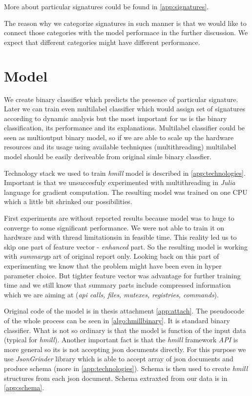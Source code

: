 More about particular signatures could be found in \ref{app:signatures}.

The reason why we categorize signatures in such manner is that we would like to connect those categories with the model performace in the further discussion. We expect that different categories might have different performance.

\section{Model}
We create binary classifier which predicts the presence of particular signature. Later we can train even multilabel classifier which would assign set of signatures according to dynamic analysis but the most important for us is the binary classification, its performance and its explanations. Multilabel classifier could be seen as multioutput binary model, so if we are able to scale up the hardware resources and its usage using available techniques (multithreading) multilabel model should be easily deriveable from original simle binary classfier.

Technology stack we used to train \emph{hmill} model is described in \ref{app:technologies}. Important is that we unsuccesfuly experimented with multithreading in \emph{Julia} language for gradient computation. The resulting model was trained on one CPU which a little bit shrinked our possibilities.

First experiments are without reported results because model was to huge to converge to some significant performance. We were not able to train it on hardware and with thread limitationsin in feasible time. This reality led us to skip one part of feature vector - \emph{enhanced} part. So the resulting model is working with \emph{summary}p art of original report only. Looking back on this part of experimenting we know that the problem might have been even in hyper parameter choice. But tighter feature vector was advantage for further training time and we still know that summary parts include compressed information which we are aiming at (\emph{api calls, files, mutexes, registries, commands}).

Original code of the model is in thesis attachment \ref{app:attach}. The pseudocode of the whole process can be seen in \ref{algo:hmillbinary}. It is standard binary classifier. What is not so ordinary is that the model is function of the input data (typical for \emph{hmill}). Another important fact is that the \emph{hmill} framework \emph{API} is more general so its is not accepting json documents directly. For this purpose we use \emph{JsonGrinder} library which is able to accept array of json documents and produce schema (more in \ref{app:technologies}). Schema is then used to create \emph{hmill} structures from each json document. Schema extraxted from our data is in \ref{app:schema}.

